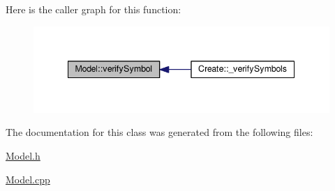Here is the caller graph for this function\-:\nopagebreak
\begin{figure}[H]
\begin{center}
\leavevmode
\includegraphics[width=342pt]{class_model_ae2be8579f8519eec5da9e6f72c7ec361_icgraph}
\end{center}
\end{figure}




The documentation for this class was generated from the following files\-:\begin{DoxyCompactItemize}
\item 
\hyperlink{_model_8h}{Model.\-h}\item 
\hyperlink{_model_8cpp}{Model.\-cpp}\end{DoxyCompactItemize}
